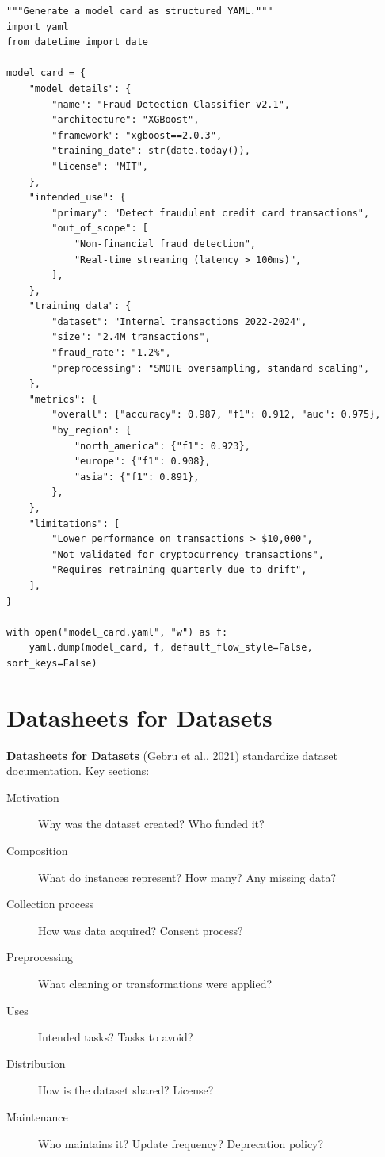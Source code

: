 \begin{codeblock}[title=\textbf{Model card generation with Python}]
\begin{verbatim}
"""Generate a model card as structured YAML."""
import yaml
from datetime import date

model_card = {
    "model_details": {
        "name": "Fraud Detection Classifier v2.1",
        "architecture": "XGBoost",
        "framework": "xgboost==2.0.3",
        "training_date": str(date.today()),
        "license": "MIT",
    },
    "intended_use": {
        "primary": "Detect fraudulent credit card transactions",
        "out_of_scope": [
            "Non-financial fraud detection",
            "Real-time streaming (latency > 100ms)",
        ],
    },
    "training_data": {
        "dataset": "Internal transactions 2022-2024",
        "size": "2.4M transactions",
        "fraud_rate": "1.2%",
        "preprocessing": "SMOTE oversampling, standard scaling",
    },
    "metrics": {
        "overall": {"accuracy": 0.987, "f1": 0.912, "auc": 0.975},
        "by_region": {
            "north_america": {"f1": 0.923},
            "europe": {"f1": 0.908},
            "asia": {"f1": 0.891},
        },
    },
    "limitations": [
        "Lower performance on transactions > $10,000",
        "Not validated for cryptocurrency transactions",
        "Requires retraining quarterly due to drift",
    ],
}

with open("model_card.yaml", "w") as f:
    yaml.dump(model_card, f, default_flow_style=False, sort_keys=False)
\end{verbatim}
\end{codeblock}

\section{Datasheets for Datasets}
\label{sec:datasheets}

\textbf{Datasheets for Datasets} (Gebru et al., 2021)
standardize dataset documentation. Key sections:

\begin{toolbox}[title=\textbf{Datasheet sections}]
\begin{description}
  \item[Motivation] Why was the dataset created? Who funded it?
  \item[Composition] What do instances represent? How many? Any
    missing data?
  \item[Collection process] How was data acquired? Consent process?
  \item[Preprocessing] What cleaning or transformations were applied?
  \item[Uses] Intended tasks? Tasks to avoid?
  \item[Distribution] How is the dataset shared? License?
  \item[Maintenance] Who maintains it? Update frequency? Deprecation
    policy?
\end{description}
\end{toolbox}

